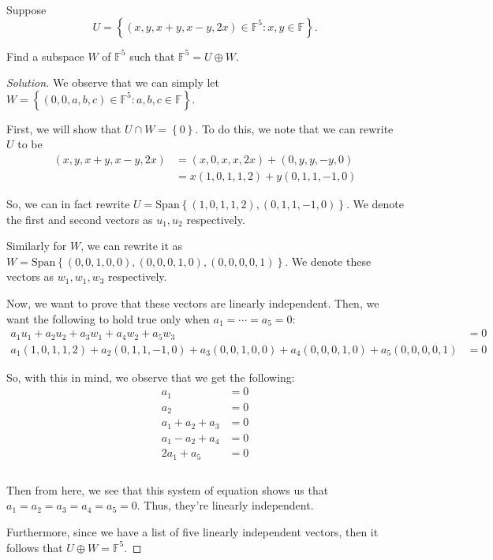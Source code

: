 \documentclass[openany]{book}
\newenvironment{solution}{\begin{proof}[Solution]}{\end{proof}}
\newcommand{\Span}{\mathrm{Span}}
\begin{document}
\begin{hw}
	Suppose
	\begin{equation*}
		U = \left\{  (x,y,x+y,x-y, 2x) \in \mathbb{F}^{5} : x,y \in \mathbb{F} \right\}.
	\end{equation*}

	Find a subspace $W$ of $\mathbb{F}^{5}$ such that $\mathbb{F}^{5} = U \oplus W$.
\end{hw}
\begin{solution}
	We observe that we can simply let $W = \left\{  (0,0,a,b,c) \in \mathbb{F}^{5} : a,b,c \in \mathbb{F} \right\}$.
	
	First, we will show that $U \cap W = \left\{  0\right\}$. To do this, we note that we can rewrite $U$ to be
	\begin{align*}
		(x,y,x+y,x-y,2x) &= (x,0,x,x,2x) + (0,y,y,-y,0) \\
		&= x(1,0,1,1,2) + y(0,1,1,-1,0)
	\end{align*}

	So, we can in fact rewrite $U = \Span\left\{  (1,0,1,1,2), (0,1,1,-1,0) \right\}$. We denote the first and second vectors as $u_{1}, u_{2}$ respectively.
	
	Similarly for $W$, we can rewrite it as $W = \Span\left\{  (0,0,1,0,0), (0,0,0,1,0), (0,0,0,0,1) \right\}$. We denote these vectors as $w_{1}, w_{1}, w_{3}$ respectively.
	
	Now, we want to prove that these vectors are linearly independent. Then, we want the following to hold true only when $a_{1} = \cdots = a_{5} =0 $:
	\begin{align*}
		a_{1}u_{1} + a_{2}u_{2} + a_{3}w_{1} + a_{4}w_{2} + a_{5}w_{3} &= 0 \\
		a_{1}(1,0,1,1,2) + a_{2}(0,1,1,-1,0) + a_{3}(0,0,1,0,0) + a_{4}(0,0,0,1,0) + a_{5}(0,0,0,0,1) &= 0
	\end{align*}

	So, with this in mind, we observe that we get the following:
	\begin{align*}
		a_{1} &= 0 \\
		a_{2} &= 0 \\
		a_{1} + a_{2} + a_{3} &= 0 \\
		a_{1} - a_{2} + a_{4} &= 0 \\
		2a_{1} + a_{5} &= 0 \\
		\\
	\end{align*}

	Then from here, we see that this system of equation shows us that $a_{1} = a_{2} = a_{3} = a_{4} = a_{5} = 0$. Thus, they're linearly independent.
	
	Furthermore, since we have a list of five linearly independent vectors, then it follows that $U \oplus W = \mathbb{F}^{5}$.
\end{solution}
	
\end{document}
